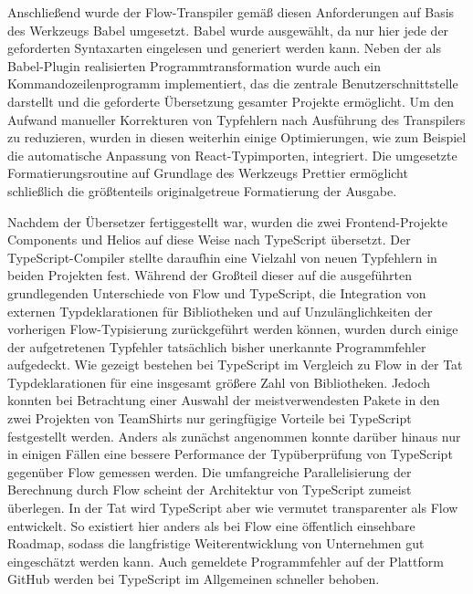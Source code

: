Anschließend wurde der Flow-Transpiler gemäß diesen Anforderungen auf Basis des Werkzeugs Babel umgesetzt. Babel wurde ausgewählt, da nur hier jede der geforderten Syntaxarten eingelesen und generiert werden kann. Neben der als Babel-Plugin realisierten Programmtransformation wurde auch ein Kommandozeilenprogramm implementiert, das die zentrale Benutzerschnittstelle darstellt und die geforderte Übersetzung gesamter Projekte ermöglicht. Um den Aufwand manueller Korrekturen von Typfehlern nach Ausführung des Transpilers zu reduzieren, wurden in diesen weiterhin einige Optimierungen, wie zum Beispiel die automatische Anpassung von React-Typimporten, integriert. Die umgesetzte Formatierungsroutine auf Grundlage des Werkzeugs Prettier ermöglicht schließlich die größtenteils originalgetreue Formatierung der Ausgabe.

Nachdem der Übersetzer fertiggestellt war, wurden die zwei Frontend-Projekte Components und Helios auf diese Weise nach TypeScript übersetzt. Der TypeScript-Compiler stellte daraufhin eine Vielzahl von neuen Typfehlern in beiden Projekten fest. Während der Großteil dieser auf die ausgeführten  grundlegenden Unterschiede von Flow und TypeScript, die Integration von externen Typdeklarationen für Bibliotheken und auf Unzulänglichkeiten der vorherigen Flow-Typisierung zurückgeführt werden können, wurden durch einige der aufgetretenen Typfehler tatsächlich bisher unerkannte Programmfehler aufgedeckt. Wie gezeigt bestehen bei TypeScript im Vergleich zu Flow in der Tat Typdeklarationen für eine insgesamt größere Zahl von Bibliotheken. Jedoch konnten bei Betrachtung einer Auswahl der meistverwendesten Pakete in den zwei Projekten von TeamShirts nur geringfügige Vorteile bei TypeScript festgestellt werden. Anders als zunächst angenommen konnte darüber hinaus nur in einigen Fällen eine bessere Performance der Typüberprüfung von TypeScript gegenüber Flow gemessen werden. Die umfangreiche Parallelisierung der Berechnung durch Flow scheint der Architektur von TypeScript zumeist überlegen. In der Tat wird TypeScript aber wie vermutet transparenter als Flow entwickelt. So existiert hier anders als bei Flow eine öffentlich einsehbare Roadmap, sodass die langfristige Weiterentwicklung von Unternehmen gut eingeschätzt werden kann. Auch gemeldete Programmfehler auf der Plattform GitHub werden bei TypeScript im Allgemeinen schneller behoben.


